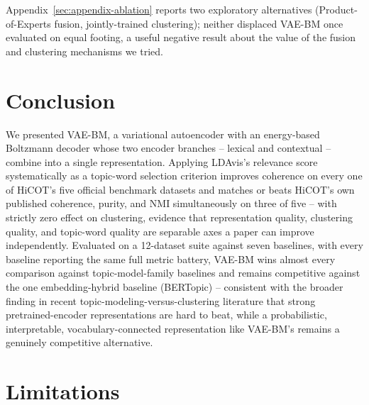 \documentclass[11pt]{article}
\begin{document}
Appendix~\ref{sec:appendix-ablation} reports two exploratory alternatives (Product-of-Experts fusion, jointly-trained clustering); neither displaced VAE-BM once evaluated on equal footing, a useful negative result about the value of the fusion and clustering mechanisms we tried.

\section{Conclusion}

We presented VAE-BM, a variational autoencoder with an energy-based Boltzmann decoder whose two encoder branches -- lexical and contextual -- combine into a single representation. Applying LDAvis's relevance score systematically as a topic-word selection criterion improves coherence on every one of HiCOT's five official benchmark datasets and matches or beats HiCOT's own published coherence, purity, and NMI simultaneously on three of five -- with strictly zero effect on clustering, evidence that representation quality, clustering quality, and topic-word quality are separable axes a paper can improve independently. Evaluated on a 12-dataset suite against seven baselines, with every baseline reporting the same full metric battery, VAE-BM wins almost every comparison against topic-model-family baselines and remains competitive against the one embedding-hybrid baseline (BERTopic) -- consistent with the broader finding in recent topic-modeling-versus-clustering literature that strong pretrained-encoder representations are hard to beat, while a probabilistic, interpretable, vocabulary-connected representation like VAE-BM's remains a genuinely competitive alternative.

\section*{Limitations}
\label{sec:limitations}
\end{document}
